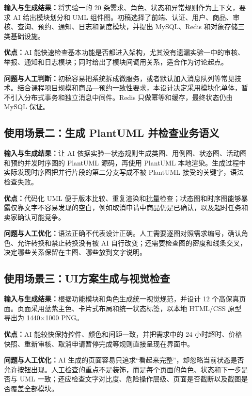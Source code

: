 \documentclass[12pt,a4paper]{ctexart}
\begin{document}
\textbf{输入与生成结果：}将实验一的 20 条需求、角色、状态和异常规则作为上下文，要求 AI 给出模块划分和 UML 组件图。初稿选择了前端、认证、用户、商品、审核、查询、预约、通知、日志和调度模块，并提出 MySQL、Redis 和对象存储三类基础设施。

\textbf{优点：}AI 能快速检查基本功能是否都进入架构，尤其没有遗漏实验一中的审核、举报、通知和日志模块；同时给出了模块间调用关系，适合作为讨论起点。

\textbf{问题与人工判断：}初稿容易把系统拆成微服务，或者默认加入消息队列等常见技术。结合课程项目规模和商品—预约一致性要求，本设计决定采用模块化单体，暂不引入分布式事务和独立消息中间件。Redis 只做幂等和缓存，最终状态仍由 MySQL 保证。

\subsection{使用场景二：生成 PlantUML 并检查业务语义}

\textbf{输入与生成结果：}让 AI 依据实验一状态规则生成类图、用例图、状态图、活动图和预约并发时序图的 PlantUML 源码，再使用 PlantUML 本地渲染。生成过程中实际发现时序图把并行片段的第二分支写成不被 PlantUML 接受的关键字，语法检查失败。

\textbf{优点：}代码化 UML 便于版本比较、重复渲染和批量检查；状态图和时序图能够暴露仅靠文字不容易发现的空白，例如取消申请中商品仍是已确认，以及超时任务和卖家确认可能竞争。

\textbf{问题与人工优化：}语法正确不代表设计正确。人工需要逐图对照需求编号，确认角色、允许转换和禁止转换没有被 AI 自行改变；还需要检查图的密度和线条交叉，决定哪些关系保留在主图、哪些放到文字说明。

\subsection{使用场景三：UI方案生成与视觉检查}

\textbf{输入与生成结果：}根据功能模块和角色生成统一视觉规范，并设计 12 个高保真页面。页面采用蓝紫主色、卡片式布局和统一状态标签，以本地 HTML/CSS 原型导出为 1440×1000 PNG。

\textbf{优点：}AI 能较快保持控件、颜色和间距一致，并把需求中的 24 小时超时、价格快照、重新审核、取消申请暂停完成等规则直接呈现在界面中。

\textbf{问题与人工优化：}AI 生成的页面容易只追求“看起来完整”，却忽略当前状态是否允许按钮出现。人工检查的重点不是装饰，而是每个页面的角色、状态和下一步是否与 UML 一致；还应检查文字对比度、危险操作层级、页面是否截断以及截图是否覆盖全部模块。
\end{document}
